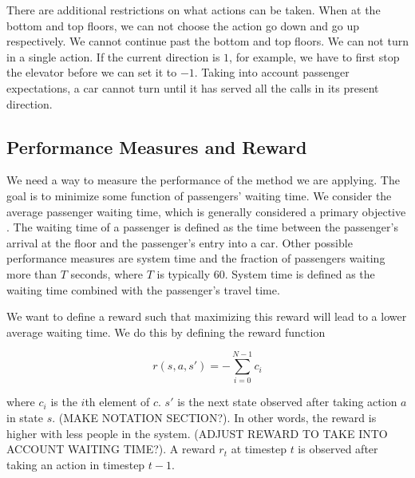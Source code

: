 There are additional restrictions on what actions can be taken. When at the bottom and top floors, we can not choose the action go down and go up respectively. We cannot continue past the bottom and top floors. We can not turn in a single action. If the current direction is $1$, for example, we have to first stop the elevator before we can set it to $-1$. Taking into account passenger expectations, a car cannot turn until it has served all the calls in its present direction.

\subsection{Performance Measures and Reward}

We need a way to measure the performance of the method we are applying. The goal is to minimize some function of passengers' waiting time. We consider the average passenger waiting time, which is generally considered a primary objective \cite{elevator_dynamics}. The waiting time of a passenger is defined as the time between the passenger's arrival at the floor and the passenger's entry into a car. Other possible performance measures are system time and the fraction of passengers waiting more than $T$ seconds, where $T$ is typically 60. System time is defined as the waiting time combined with the passenger's travel time.

We want to define a reward such that maximizing this reward will lead to a lower average waiting time. We do this by defining the reward function

\[
    r(s, a, s') = - \sum_{i=0}^{N-1} c_i    
\]

where $c_i$ is the $i$th element of $c$. $s'$ is the next state observed after taking action $a$ in state $s$. {\color{red} (MAKE NOTATION SECTION?)}. In other words,
the reward is higher with less people in the system. {\color{red} (ADJUST REWARD TO TAKE INTO ACCOUNT WAITING TIME?)}. A reward $r_t$ at timestep $t$ is observed after taking an action in timestep $t - 1$. 

